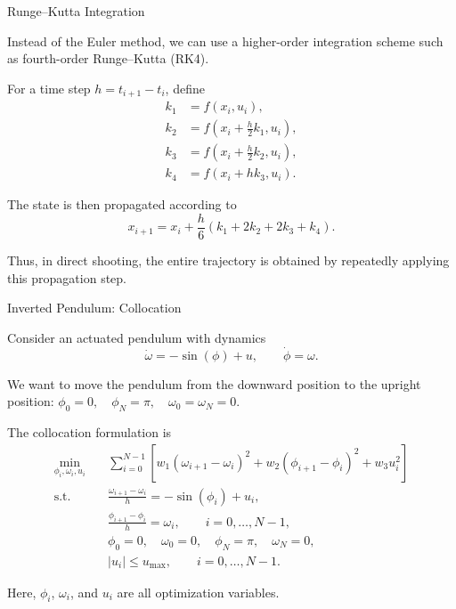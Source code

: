 \documentclass{beamer}
\begin{document}
\begin{frame}{Runge--Kutta Integration}
	\begin{flushleft}
		Instead of the Euler method, we can use a higher-order
		integration scheme such as fourth-order Runge--Kutta (RK4).
		
		\vspace{0.5em}
		
		For a time step $h=t_{i+1}-t_i$, define
		\[
		\begin{aligned}
			k_1 &= f(x_i,u_i),\\
			k_2 &= f\left(x_i+\frac{h}{2}k_1,u_i\right),\\
			k_3 &= f\left(x_i+\frac{h}{2}k_2,u_i\right),\\
			k_4 &= f\left(x_i+h k_3,u_i\right).
		\end{aligned}
		\]
		
		\vspace{0.5em}
		
		The state is then propagated according to
		\[
		x_{i+1}
		=
		x_i
		+
		\frac{h}{6}
		\left(
		k_1+2k_2+2k_3+k_4
		\right).
		\]
		
		Thus, in direct shooting, the entire trajectory is
		obtained by repeatedly applying this propagation step.
	\end{flushleft}
\end{frame}
\begin{frame}{Inverted Pendulum: Collocation}
	\begin{flushleft}
		Consider an actuated pendulum with dynamics
		\[
		\dot{\omega}=-\sin(\phi)+u,
		\qquad
		\dot{\phi}=\omega.
		\]
		
		\vspace{0.5em}
		
		We want to move the pendulum from the downward position
		to the upright position: $		\phi_0=0,
		\quad
		\phi_N=\pi,
		\quad
		\omega_0=\omega_N=0.$

		The collocation formulation is
		\[
		\begin{aligned}
			\min_{\phi_i,\omega_i,u_i}\quad
			&
			\sum_{i=0}^{N-1}
			\left[
			w_1(\omega_{i+1}-\omega_i)^2
			+
			w_2(\phi_{i+1}-\phi_i)^2
			+
			w_3u_i^2
			\right]
			\\[0.5em]
			\text{s.t.}\quad
			&
			\frac{\omega_{i+1}-\omega_i}{h}
			=
			-\sin(\phi_i)+u_i,
			\\
			&
			\frac{\phi_{i+1}-\phi_i}{h}
			=
			\omega_i,
			\qquad i=0,\ldots,N-1,
			\\
			&
			\phi_0=0,\quad
			\omega_0=0,\quad
			\phi_N=\pi,\quad
			\omega_N=0,
			\\
			&
			|u_i|\leq u_{\max},
			\qquad i=0,\ldots,N-1.
		\end{aligned}
		\]
		
		Here, $\phi_i$, $\omega_i$, and $u_i$ are all
		optimization variables.
	\end{flushleft}
\end{frame}
\end{document}
